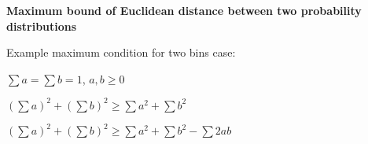 \documentclass[fleqn]{article}
\let\ds\displaystyle
\begin{document}

\textbf{Maximum bound of Euclidean distance between two probability distributions}
\newline

Example maximum condition for two bins case: 
\newline

$\sum a = \sum b = 1$, $a , b \geq 0$
\newline

$(\sum a)^2 + (\sum b)^2 \geq \sum a^2 + \sum b^2$
\newline

$(\sum a)^2 + (\sum b)^2 \geq \sum a^2 + \sum b^2 - \sum 2ab $ 
\newline
\end{document}
